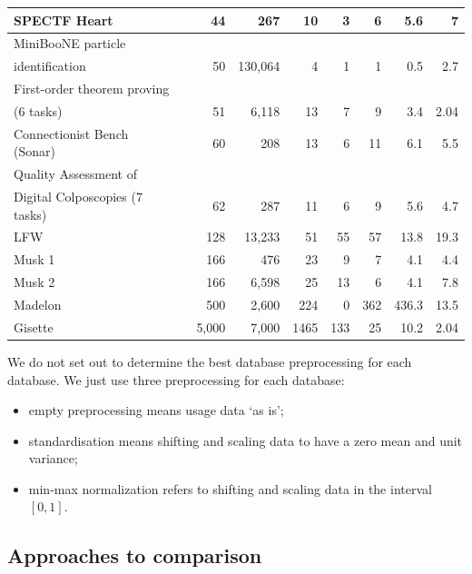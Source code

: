 \documentclass[entropy,article,submit,moreauthors,pdftex]{Definitions/mdpi}
\begin{document}
\begin{table}[tb]
\begin{tabular}{lcrrrrrrr}
SPECTF Heart & \cite{HeartDB} & 44 & 267 & 10 & 3 & 6 & 5.6 & 7\\ \hline
MiniBooNE particle &&&&&&&&\\
identification & \cite{MiniBooNEDB} & 50 & 130,064 & 4 & 1 & 1 & 0.5 & 2.7\\ \hline
First-order theorem proving &&&&&&&&\\
 (6 tasks) & \cite{bridge2014, TheoremDB} & 51 & 6,118 & 13 & 7 & 9 & 3.4 & 2.04\\ \hline
Connectionist Bench (Sonar) & \cite{SonarDB} & 60 & 208 & 13 & 6 & 11 & 6.1 & 5.5\\ \hline
Quality Assessment of &&&&&&&&\\
Digital Colposcopies (7 tasks) & \cite{ColposcopiesDB, fernandes2017} & 62 & 287 & 11 & 6 & 9 & 5.6 & 4.7\\ \hline
LFW & \cite{LFWTech} & 128 & 13,233 & 51 & 55 & 57 & 13.8 & 19.3\\ \hline
Musk 1 & \cite{MuskDB} & 166 & 476 & 23 & 9 & 7 & 4.1 & 4.4\\ \hline
Musk 2 & \cite{MuskDB} & 166 & 6,598 & 25 & 13 & 6 & 4.1 & 7.8\\ \hline
Madelon & \cite{guyon2005, MadelonDB} & 500 & 2,600 & 224 & 0 & 362 & 436.3 & 13.5\\ \hline
Gisette & \cite{GisetteDB, guyon2005} & 5,000 & 7,000 & 1465 & 133 & 25 & 10.2 & 2.04\\
\bottomrule
\end{tabular}
\label{tab:DBs}
\end{table}

We do not set out to determine the best database preprocessing for each database. We just use three preprocessing for each database:
\begin{itemize}
  \item empty preprocessing means usage data `as is';
  \item standardisation means shifting and scaling data to have a zero mean and unit variance;
  \item min-max normalization refers to shifting and scaling data in the interval $[0,1]$.
\end{itemize}


\subsection{Approaches to comparison}
\end{document}
